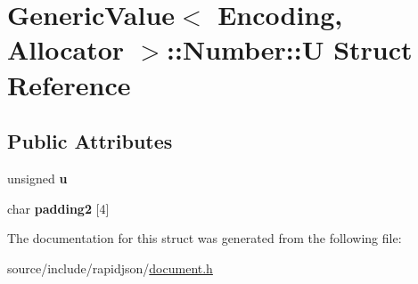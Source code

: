 \hypertarget{struct_generic_value_1_1_number_1_1_u}{}\section{Generic\+Value$<$ Encoding, Allocator $>$\+:\+:Number\+:\+:U Struct Reference}
\label{struct_generic_value_1_1_number_1_1_u}
\subsection*{Public Attributes}
\begin{DoxyCompactItemize}
\item 
\hypertarget{struct_generic_value_1_1_number_1_1_u_a175e3a2bd43e6880791eb7c950d2f147}{}unsigned {\bfseries u}\label{struct_generic_value_1_1_number_1_1_u_a175e3a2bd43e6880791eb7c950d2f147}

\item 
\hypertarget{struct_generic_value_1_1_number_1_1_u_a9341f65c1645f24fd001a1ebf58d3c5b}{}char {\bfseries padding2} \mbox{[}4\mbox{]}\label{struct_generic_value_1_1_number_1_1_u_a9341f65c1645f24fd001a1ebf58d3c5b}

\end{DoxyCompactItemize}


The documentation for this struct was generated from the following file\+:\begin{DoxyCompactItemize}
\item 
source/include/rapidjson/\hyperlink{document_8h}{document.\+h}\end{DoxyCompactItemize}
